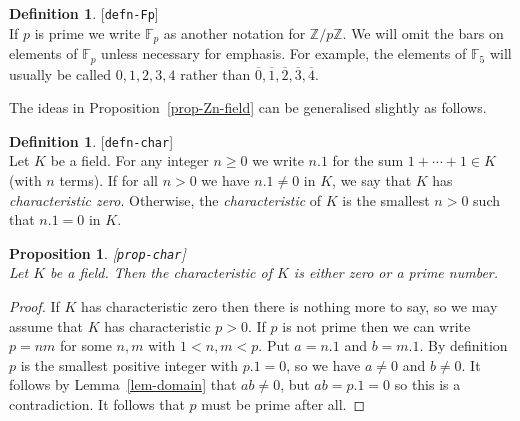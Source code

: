 \documentclass{amsart}
\newcommand{\lbl}[1]{\label{#1}\textup{[\texttt{#1}]}\ \\}
\newcommand{\lbl}{\label}
\newcommand{\Z}         {{\mathbb{Z}}}
\newcommand{\F}         {{\mathbb{F}}}
\newcommand{\ov}[1]     {\overline{#1}}
\renewcommand{\:}{\colon}
\newtheorem{proposition}[theorem]{Proposition}
\theoremstyle{definition}
\newtheorem{definition}[theorem]{Definition}
\begin{document}
\begin{definition}\lbl{defn-Fp}
 If $p$ is prime we write $\F_p$ as another notation for $\Z/p\Z$.  We
 will omit the bars on elements of $\F_p$ unless necessary for
 emphasis.  For example, the elements of $\F_5$ will usually be called
 $0,1,2,3,4$ rather than $\ov{0},\ov{1},\ov{2},\ov{3},\ov{4}$.
\end{definition}

The ideas in Proposition~\ref{prop-Zn-field} can be generalised
slightly as follows.

\begin{definition}\lbl{defn-char}
 Let $K$ be a field.  For any integer $n\geq 0$ we write $n.1$ for the
 sum $1+\dotsb+1\in K$ (with $n$ terms).  If for all $n>0$ we have
 $n.1\neq 0$ in $K$, we say that $K$ has \emph{characteristic zero}.
 Otherwise, the \emph{characteristic} of $K$ is the smallest $n>0$
 such that $n.1=0$ in $K$.
\end{definition}

\begin{proposition}\lbl{prop-char}
 Let $K$ be a field.  Then the characteristic of $K$ is either zero or
 a prime number.
\end{proposition}
\begin{proof}
 If $K$ has characteristic zero then there is nothing more to say, so
 we may assume that $K$ has characteristic $p>0$.  If $p$ is not prime
 then we can write $p=nm$ for some $n,m$ with $1<n,m<p$.  Put $a=n.1$
 and $b=m.1$.  By definition $p$ is the smallest positive integer with
 $p.1=0$, so we have $a\neq 0$ and $b\neq 0$.  It follows by
 Lemma~\ref{lem-domain} that $ab\neq 0$, but $ab=p.1=0$ so this is a
 contradiction.  It follows that $p$ must be prime after all.
\end{proof}
\end{document}
